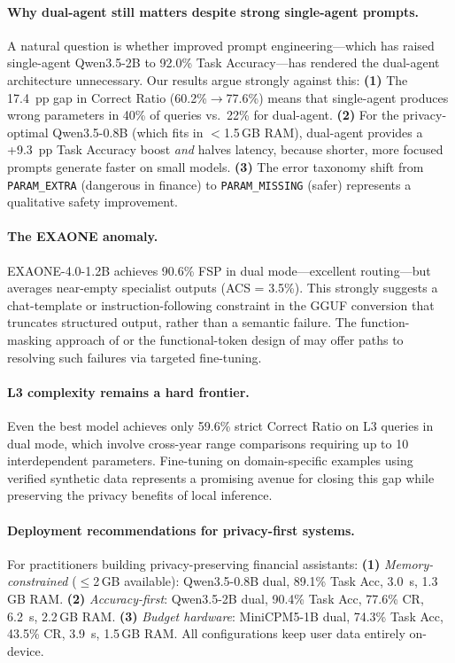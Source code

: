 \documentclass[11pt,twocolumn]{article}
\begin{document}
\paragraph{Why dual-agent still matters despite strong single-agent prompts.}
A natural question is whether improved prompt engineering---which has raised single-agent Qwen3.5-2B to 92.0\% Task Accuracy---has rendered the dual-agent architecture unnecessary.
Our results argue strongly against this:
\textbf{(1)} The 17.4~pp gap in Correct Ratio (60.2\%$\to$77.6\%) means that single-agent produces wrong parameters in 40\% of queries vs.\ 22\% for dual-agent.
\textbf{(2)} For the privacy-optimal Qwen3.5-0.8B (which fits in $<$1.5\,GB RAM), dual-agent provides a +9.3~pp Task Accuracy boost \emph{and} halves latency, because shorter, more focused prompts generate faster on small models.
\textbf{(3)} The error taxonomy shift from \texttt{PARAM\_EXTRA} (dangerous in finance) to \texttt{PARAM\_MISSING} (safer) represents a qualitative safety improvement.

\paragraph{The EXAONE anomaly.}
EXAONE-4.0-1.2B achieves 90.6\% FSP in dual mode---excellent routing---but averages near-empty specialist outputs (ACS = 3.5\%).
This strongly suggests a chat-template or instruction-following constraint in the GGUF conversion that truncates structured output, rather than a semantic failure.
The function-masking approach of \citet{lin2024hammer} or the functional-token design of \citet{chen2024octopus} may offer paths to resolving such failures via targeted fine-tuning.

\paragraph{L3 complexity remains a hard frontier.}
Even the best model achieves only 59.6\% strict Correct Ratio on L3 queries in dual mode, which involve cross-year range comparisons requiring up to 10 interdependent parameters.
Fine-tuning on domain-specific examples using verified synthetic data \citep{liu2024apigen} represents a promising avenue for closing this gap while preserving the privacy benefits of local inference.

\paragraph{Deployment recommendations for privacy-first systems.}
For practitioners building privacy-preserving financial assistants:
\textbf{(1)} \emph{Memory-constrained} ($\leq$2\,GB available): Qwen3.5-0.8B dual, 89.1\% Task Acc, 3.0~s, 1.3\,GB RAM.
\textbf{(2)} \emph{Accuracy-first}: Qwen3.5-2B dual, 90.4\% Task Acc, 77.6\% CR, 6.2~s, 2.2\,GB RAM.
\textbf{(3)} \emph{Budget hardware}: MiniCPM5-1B dual, 74.3\% Task Acc, 43.5\% CR, 3.9~s, 1.5\,GB RAM.
All configurations keep user data entirely on-device.
\end{document}
